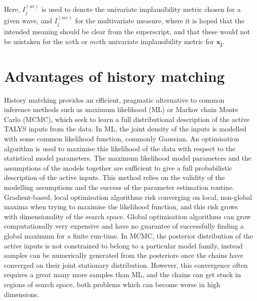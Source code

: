 \documentclass[
  12pt,
  a4paper,
  twoside]{book}
\begin{document}
Here, \(I_j^{(uv)}\) is used to denote the univariate implausibility metric chosen for a given wave, and \(I_j^{(mv)}\) for the multivariate measure, where it is hoped that the intended meaning should be clear from the superscript, and that these would not be mistaken for the \(uv\)th or \(mv\)th univariate implausibility metric for \(\mathbf{x_j}\).

\hypertarget{advantages-of-history-matching}{%
\section{Advantages of history matching}\label{advantages-of-history-matching}}

History matching provides an efficient, pragmatic alternative to common inference methods such as maximum likelihood (ML) or Markov chain Monte Carlo (MCMC), which seek to learn a full distributional description of the active TALYS inputs from the data. In ML, the joint density of the inputs is modelled with some common likelihood function, commonly Gaussian. An optimisation algorithm is used to maximise this likelihood of the data with respect to the statistical model parameters. The maximum likelihood model parameters and the assumptions of the models together are sufficient to give a full probabilistic description of the active inputs. This method relies on the validity of the modelling assumptions and the success of the parameter estimation routine. Gradient-based, local optimisation algorithms risk converging on local, non-global maxima when trying to maximise the likelihood function, and this risk grows with dimensionality of the search space. Global optimisation algorithms can grow computationally very expensive and have no guarantee of successfully finding a global maximum for a finite run-time. In MCMC, the posterior distribution of the active inputs is not constrained to belong to a particular model family, instead samples can be numerically generated from the posteriors once the chains have converged on their joint stationary distribution. However, this convergence often requires a great many more samples than ML, and the chains can get stuck in regions of search space, both problems which can become worse in high dimensions.
\end{document}
